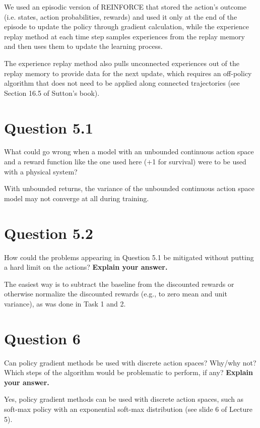 \documentclass[12pt]{article}
\begin{document}
We used an episodic version of REINFORCE that stored the action's outcome (i.e. states, action probabilities, rewards) and used it only at the end of the episode to update the policy through gradient calculation, while the experience replay method at each time step samples experiences from the replay memory and then uses them to update the learning process. 
\newline

The experience replay method also pulls unconnected experiences out of the replay memory to provide data for the next update, which requires an off-policy algorithm that does not need to be applied along connected trajectories (see Section 16.5 of Sutton's book).


\section*{Question 5.1}

What could go wrong when a model with an unbounded continuous
action space and a reward function like the one used here (+1 for survival) were to be used with
a physical system?
\newline

With unbounded returns, the variance of the unbounded continuous action space model may not converge at all during training.


\section*{Question 5.2}

How could the problems appearing in Question 5.1 be mitigated
without putting a hard limit on the actions? \textbf{Explain your answer.}
\newline

The easiest way is to subtract the baseline from the discounted rewards or otherwise normalize the discounted rewards (e.g., to zero mean and unit variance), as was done in Task 1 and 2.


\section*{Question 6}

Can policy gradient methods be used with discrete action spaces?
Why/why not? Which steps of the algorithm would be problematic to perform, 
if any? \textbf{Explain your answer.}
\newline

Yes, policy gradient methods can be used with discrete action spaces, such as soft-max policy with an exponential soft-max distribution (see slide 6 of Lecture 5).
\newline
\end{document}
